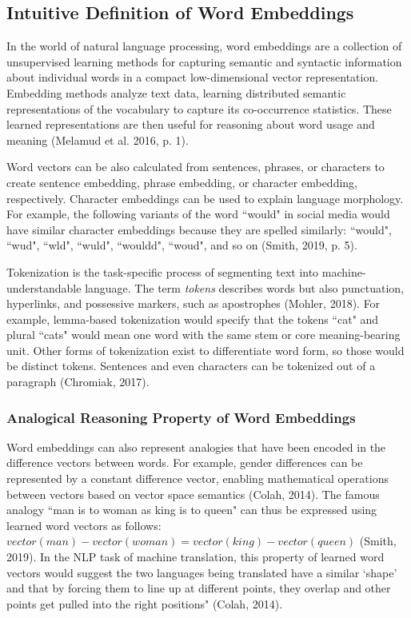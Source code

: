 \subsection{Intuitive Definition of Word Embeddings} \label{sec:WordEmb_Intuition}

In the world of natural language processing, word embeddings are a collection of unsupervised learning methods for capturing semantic and syntactic information about individual words in a compact low-dimensional vector representation. Embedding methods analyze text data, learning distributed semantic representations of the vocabulary to capture its co-occurrence statistics. These learned representations are then useful for reasoning about word usage and meaning (Melamud et al. 2016, p. 1). 

Word vectors can be also calculated from sentences, phrases, or characters to create sentence embedding, phrase embedding, or character embedding, respectively. Character embeddings can be used to explain language morphology. For example, the following variants of the word ``would" in social media would have similar character embeddings because they are spelled similarly: ``would", ``wud", ``wld", ``wuld", ``wouldd", ``woud", and so on (Smith, 2019, p. 5). 

Tokenization is the task-specific process of segmenting text into machine-understandable language. The term \emph{tokens} describes words but also punctuation, hyperlinks, and possessive markers, such as apostrophes (Mohler, 2018). For example, lemma-based tokenization would specify that the tokens ``cat" and plural ``cats" would mean one word with the same stem or core meaning-bearing unit. Other forms of tokenization exist to differentiate word form, so those would be distinct tokens. Sentences and even characters can be tokenized out of a paragraph (Chromiak, 2017). 

\subsubsection{Analogical Reasoning Property of Word Embeddings} \label{sec:WordEmb_AnalogyFeature}

Word embeddings can also represent analogies that have been encoded in the difference vectors between words. For example, gender differences can be represented by a constant difference vector, enabling mathematical operations between vectors based on vector space semantics (Colah, 2014). The famous analogy ``man is to woman as king is to queen" can thus be expressed using learned word vectors as follows: $vector(man) - vector(woman) = vector(king) - vector(queen)$ (Smith, 2019). In the NLP task of machine translation, this property of learned word vectors would suggest the two languages being translated have a similar `shape' and that by forcing them to line up at different points, they overlap and other points get pulled into the right positions" (Colah, 2014).

